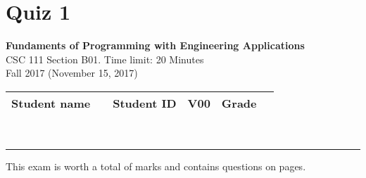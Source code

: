 \documentclass[12pt]{exam}
\newcommand{\course}{Fundaments of Programming with Engineering Applications}
\newcommand{\coursenumber}{CSC 111}
\newcommand{\sections}{B01}
\newcommand{\term}{Fall 2017}
\newcommand{\timelimit}{20 Minutes}
\newcommand{\examtitle}{Quiz 1}
\newcommand{\examdate}{November 15, 2017}
\begin{document}
\noindent
\section*{\examtitle}
\textbf{\course} \\
{\footnotesize \coursenumber{} Section \sections. Time limit: \timelimit} \\
{\footnotesize \term{} (\examdate)} \\

\noindent
\begin{tabularx}{\textwidth}{|X|X|X|X|X|X|}
    \hline
    \small{Student name} & \small{} & \small{Student ID} & \small\bfseries{V00} & \small{Grade} & \small{} \\
    \hline
\end{tabularx}

\noindent \\
\rule[2ex]{\textwidth}{2pt}

\centering
{\footnotesize This exam is worth a total of \numpoints{} marks and contains \numquestions{} questions on \numpages{} pages.}
\end{document}
